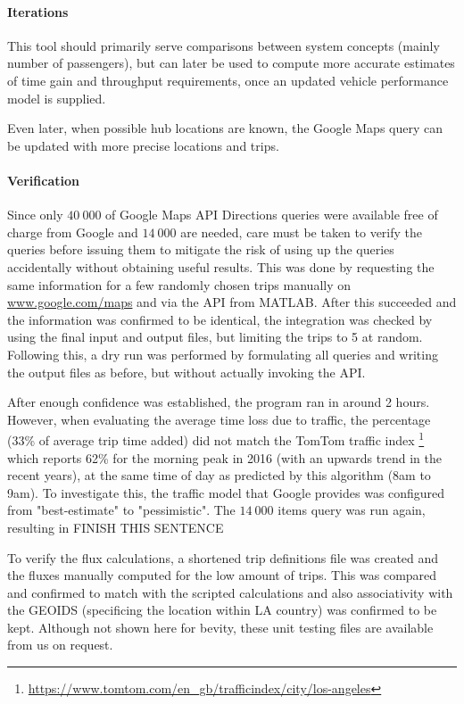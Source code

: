 \paragraph{Iterations}

This tool should primarily serve comparisons between system concepts (mainly number of passengers), but can later be used to compute more accurate estimates of time gain and throughput requirements, once an updated vehicle performance model is supplied.

Even later, when possible hub locations are known, the Google Maps query can be updated with more precise locations and trips.


\paragraph{Verification}

Since only $40\ 000$ of Google Maps API Directions queries were available free of charge from Google and $14\ 000$ are needed, care must be taken to verify the queries before issuing them to mitigate the risk of using up the queries accidentally without obtaining useful results. This was done by requesting the same information for a few randomly chosen trips manually on \url{www.google.com/maps} and via the API from MATLAB. After this succeeded and the information was confirmed to be identical, the integration was checked by using the final input and output files, but limiting the trips to 5 at random. Following this, a dry run was performed by formulating all queries and writing the output files as before, but without actually invoking the API. 

After enough confidence was established, the program ran in around 2 hours. However, when evaluating the average time loss due to traffic, the percentage (33\% of average trip time added) did not match the TomTom traffic index \footnote{\url{https://www.tomtom.com/en_gb/trafficindex/city/los-angeles}} which reports 62\% for the morning peak in 2016 (with an upwards trend in the recent years), at the same time of day as predicted by this algorithm (8am to 9am). To investigate this, the traffic model that Google provides was configured from "best-estimate" to "pessimistic". The $14\ 000$ items query was run again, resulting in FINISH THIS SENTENCE

To verify the flux calculations, a shortened trip definitions file was created and the fluxes manually computed for the low amount of trips. This was compared and confirmed to match with the scripted calculations and also associativity with the GEOIDS (specificing the location within LA country) was confirmed to be kept. Although not shown here for bevity, these unit testing files are available from us on request.
\fi



